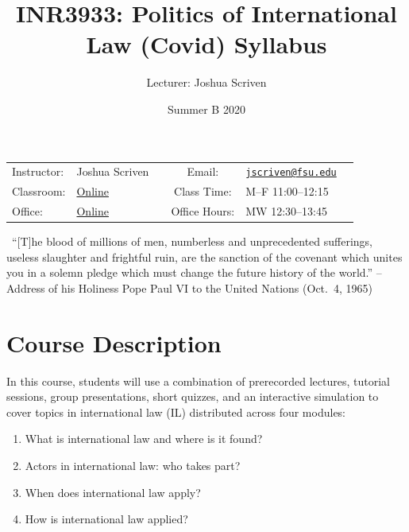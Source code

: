 \documentclass[10pt,]{article}
\title{INR3933: Politics of International Law \textbar{} (Covid) Syllabus}
\author{Lecturer: Joshua Scriven}
\date{Summer B 2020}
\providecommand{\tightlist}{%
  \setlength{\itemsep}{0pt}\setlength{\parskip}{0pt}}
\begin{document}
		\maketitle
	

		\thispagestyle{firststyle}

\begin{center}
\begin{tabular}{llccll}
\hline
\rowcolor{Gray}
Instructor: & Joshua Scriven &          \hspace{3cm}           &
Email: & \href{mailto:jscriven@fsu.edu}{\nolinkurl{jscriven@fsu.edu}}\\

Classroom: &  \href{https://fsu.zoom.us/meeting}{Online} & &
Class Time: & M--F 11:00--12:15\\
Office: & \href{https://fsu.zoom.us/meeting}{Online} & &
Office Hours: & MW 12:30--13:45\\
\hline
\end{tabular}

\begin{minipage}{5.2in}
  \begin{flushleft}
    {\color{Gray}{\RectangleBold}} ~{\footnotesize ``{[}T{]}he blood of millions of men, numberless and unprecedented
sufferings, useless slaughter and frightful ruin, are the sanction of
the covenant which unites you in a solemn pledge which must change the
future history of the world.'' --Address of his Holiness Pope Paul VI to the United Nations (Oct.~4,
1965)}\newline
  \end{flushleft}
\end{minipage}


\end{center}

\vspace{2mm}


\hypertarget{course-description}{%
\section{Course Description}\label{course-description}}

In this course, students will use a combination of prerecorded lectures,
tutorial sessions, group presentations, short quizzes, and an
interactive simulation to cover topics in international law (IL)
distributed across four modules:

\begin{enumerate}
\def\labelenumi{\arabic{enumi}.}
\tightlist
\item
  What is international law and where is it found?
\item
  Actors in international law: who takes part?
\item
  When does international law apply?
\item
  How is international law applied?
\end{enumerate}
\end{document}
